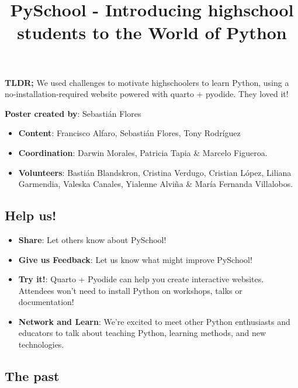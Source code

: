 \documentclass[
  letterpaper,
  DIV=11,
  numbers=noendperiod]{scrartcl}
\title{PySchool - Introducing highschool students to the World of
Python}
\author{}
\date{}
\providecommand{\tightlist}{%
  \setlength{\itemsep}{0pt}\setlength{\parskip}{0pt}}\usepackage{longtable,booktabs,array}
\begin{document}
\maketitle

\textbf{TLDR;} We used challenges to motivate highschoolers to learn
Python, using a no-installation-required website powered with quarto +
pyodide. They loved it!

\textbf{Poster created by}: Sebastián Flores

\begin{itemize}
\tightlist
\item
  \textbf{Content}: Francisco Alfaro, Sebastián Flores, Tony Rodríguez
\item
  \textbf{Coordination}: Darwin Morales, Patricia Tapia \& Marcelo
  Figueroa.
\item
  \textbf{Volunteers}: Bastián Blandskron, Cristina Verdugo, Cristian
  López, Liliana Garmendia, Valeska Canales, Yialenne Alviña \& María
  Fernanda Villalobos.
\end{itemize}

\subsection{Help us!}\label{help-us}

\begin{itemize}
\tightlist
\item
  \textbf{Share}: Let others know about PySchool!
\item
  \textbf{Give us Feedback}: Let us know what might improve PySchool!
\item
  \textbf{Try it!}: Quarto + Pyodide can help you create interactive
  websites. Attendees won't need to install Python on workshops, talks
  or documentation!
\item
  \textbf{Network and Learn}: We're excited to meet other Python
  enthusiasts and educators to talk about teaching Python, learning
  methods, and new technologies.
\end{itemize}

\subsection{The past}\label{the-past}
\end{document}
